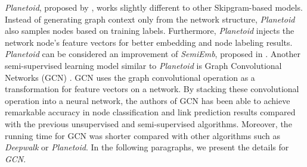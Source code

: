 \documentclass{article}
\theoremstyle{definition}
\begin{document}
\emph{Planetoid}, proposed by \cite{planetoid}, works slightly different to 
other Skipgram-based models. Instead of generating graph context only from the
network structure, \emph{Planetoid} also samples nodes based on training labels. 
Furthermore, \emph{Planetoid} injects the network node's feature vectors for better 
embedding and node labeling results. \emph{Planetoid} can be considered an
improvement of \emph{SemiEmb}, proposed in \cite{weston2012deep}. Another semi-supervised 
learning model similar to \emph{Planetoid} is Graph Convolutional 
Networks (GCN) \cite{gcn}. GCN uses the graph convolutional operation as a 
transformation for feature vectors on a network. By stacking these convolutional 
operation into a neural network, the authors of GCN has been able to achieve 
remarkable accuracy in node classification and link prediction results 
compared with the previous unsupervised and semi-supervised algorithms. 
Moreover, the running time for GCN was shorter compared with other algorithms 
such as \emph{Deepwalk} or \emph{Planetoid}. In the following paragraphs, we 
present the details for \emph{GCN}.
\end{document}
